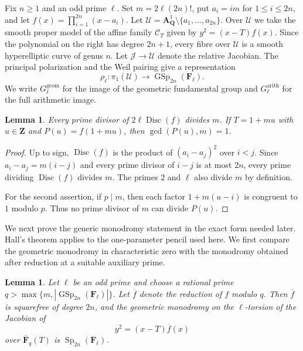 \documentclass[11pt,hidelinks]{amsart}
\newtheorem{lemma}[theorem]{Lemma}
\newcommand{\Q}{\mathbf Q}
\newcommand{\Z}{\mathbf Z}
\newcommand{\F}{\mathbf F}
\newcommand{\GSp}{\operatorname{GSp}}
\newcommand{\Sp}{\operatorname{Sp}}
\newcommand{\Disc}{\operatorname{Disc}}
\begin{document}
Fix $n\geq1$ and an odd prime $\ell$. Set
$m=2\ell(2n)!$, put $a_i=im$ for $1\leq i\leq2n$, and let $f(x)=\prod_{i=1}^{2n}(x-a_i)$. Let $\mathcal U=\mathbf A^1_\Q\setminus\{a_1,\ldots,a_{2n}\}$. Over $\mathcal U$ we take the smooth proper model of the affine family $\mathcal C_T$ given by $y^2=(x-T)f(x)$. Since the polynomial on the right has degree $2n+1$, every fibre over $\mathcal U$ is a smooth hyperelliptic curve of genus $n$. Let $\mathcal J\to\mathcal U$ denote the relative Jacobian. The principal polarization and the Weil pairing give a representation \[\rho_{\ell}: \pi_1(\mathcal U)\rightarrow \GSp_{2n}(\F_\ell).\] We write $G^{\mathrm{geom}}_\ell$ for the image of the geometric fundamental group and $G^{\mathrm{arith}}_\ell$ for the full arithmetic image.

\begin{lemma}\label{lem:fixed-primes}
Every prime divisor of $2\ell\Disc(f)$ divides $m$. If $T=1+mu$ with $u\in\Z$ and
$P(u)=f(1+mu)$, then $\gcd(P(u),m)=1$.
\end{lemma}

\begin{proof}
Up to sign, $\Disc(f)$ is the product of $(a_i-a_j)^2$ over $i<j$. Since $a_i-a_j=m(i-j)$ and every prime divisor of $i-j$ is at most $2n$, every prime dividing $\Disc(f)$ divides $m$. The primes $2$ and $\ell$ also divide $m$ by definition.

For the second assertion, if $p\mid m$, then each factor $1+m(u-i)$ is congruent to $1$ modulo $p$. Thus no prime divisor of $m$ can divide $P(u)$.
\end{proof}

We next prove the generic monodromy statement in the exact form needed later. Hall's theorem applies to the one-parameter pencil used here. We first compare the geometric monodromy in characteristic zero with the
monodromy obtained after reduction at a suitable auxiliary prime.

\begin{lemma}\label{lem:special-fibre-monodromy}
Let $\ell$ be an odd prime and choose a rational prime
$q>\max\{m,|\GSp_{2n}(\F_\ell)|\}$.  Let $\overline f$ denote the
reduction of $f$ modulo $q$.  Then $\overline f$ is squarefree of
degree $2n$, and the geometric monodromy on the $\ell$-torsion of the
Jacobian of
\[
y^2=(x-T)\overline f(x)
\]
over $\overline{\F}_q(T)$ is $\Sp_{2n}(\F_\ell)$.
\end{lemma}
\end{document}
